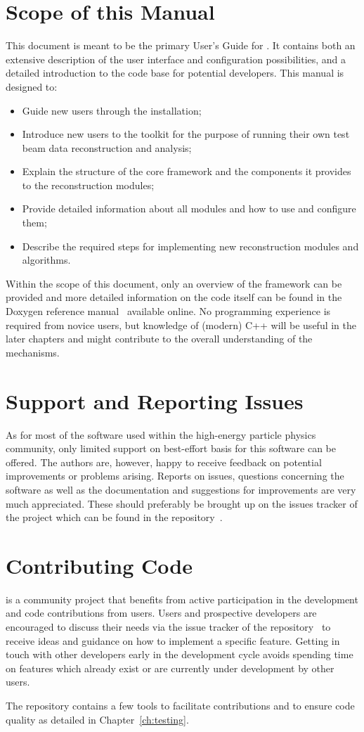 \section{Scope of this Manual}
This document is meant to be the primary User's Guide for \corry.
It contains both an extensive description of the user interface and configuration possibilities, and a detailed introduction to the code base for potential developers.
This manual is designed to:
\begin{itemize}
\item Guide new users through the installation;
\item Introduce new users to the toolkit for the purpose of running their own test beam data reconstruction and analysis;
\item Explain the structure of the core framework and the components it provides to the reconstruction modules;
\item Provide detailed information about all modules and how to use and configure them;
\item Describe the required steps for implementing new reconstruction modules and algorithms.
\end{itemize}

Within the scope of this document, only an overview of the framework can be provided and more detailed information on the code itself can be found in the Doxygen reference manual~\cite{corry-doxygen} available online.
No programming experience is required from novice users, but knowledge of (modern) C++ will be useful in the later chapters and might contribute to the overall understanding of the mechanisms.

\section{Support and Reporting Issues}
As for most of the software used within the high-energy particle physics community, only limited support on best-effort basis for this software can be offered.
The authors are, however, happy to receive feedback on potential improvements or problems arising.
Reports on issues, questions concerning the software as well as the documentation and suggestions for improvements are very much appreciated.
These should preferably be brought up on the issues tracker of the project which can be found in the repository~\cite{corry-issue-tracker}.


\section{Contributing Code}
\corry is a community project that benefits from active participation in the development and code contributions from users.
Users and prospective developers are encouraged to discuss their needs via the issue tracker of the repository~\cite{corry-issue-tracker} to receive ideas and guidance on how to implement a specific feature.
Getting in touch with other developers early in the development cycle avoids spending time on features which already exist or are currently under development by other users.

The repository contains a few tools to facilitate contributions and to ensure code quality as detailed in Chapter~\ref{ch:testing}.
